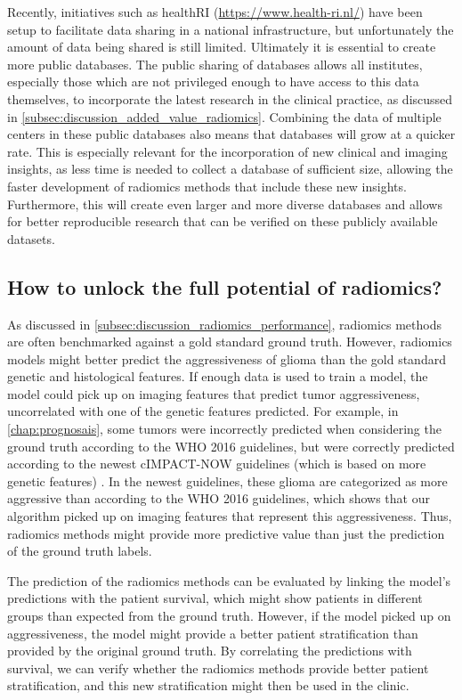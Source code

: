 Recently, initiatives such as healthRI (\url{https://www.health-ri.nl/}) have been setup to facilitate data sharing in a national infrastructure, but unfortunately the amount of data being shared is still limited.
Ultimately it is essential to create more public databases.
The public sharing of databases allows all institutes, especially those which are not privileged enough to have access to this data themselves, to incorporate the latest research in the clinical practice, as discussed in \cref{subsec:discussion_added_value_radiomics}.
Combining the data of multiple centers in these public databases also means that databases will grow at a quicker rate.
This is especially relevant for the incorporation of new clinical and imaging insights, as less time is needed to collect a database of sufficient size, allowing the faster development of radiomics methods that include these new insights.
Furthermore, this will create even larger and more diverse databases and allows for better reproducible research that can be verified on these publicly available datasets.



\subsection{How to unlock the full potential of radiomics?}

As discussed in \cref{subsec:discussion_radiomics_performance}, radiomics methods are often benchmarked against a gold standard ground truth.
However, radiomics models might better predict the aggressiveness of \gls{glioma} than the gold standard genetic and histological features.
If enough data is used to train a model, the model could pick up on imaging features that predict \gls{tumor} aggressiveness, uncorrelated with one of the genetic features predicted.
For example, in \cref{chap:prognosais}, some \glspl{tumor} were incorrectly predicted when considering the ground truth according to the \gls{WHO} 2016 guidelines, but were correctly predicted according to the newest cIMPACT-NOW guidelines (which is based on more genetic features) \autocite{lous2020impactnow}.
In the newest guidelines, these glioma are categorized as more aggressive than according to the \gls{WHO} 2016 guidelines, which shows that our algorithm picked up on imaging features that represent this aggressiveness.
Thus, radiomics methods might provide more predictive value than just the prediction of the ground truth labels.

The prediction of the radiomics methods can be evaluated by linking the model's predictions with the patient survival, which might show patients in different groups than expected from the ground truth.
However, if the model picked up on aggressiveness, the model might provide a better patient stratification than provided by the original ground truth.
By correlating the predictions with survival, we can verify whether the radiomics methods provide better patient stratification, and this new stratification might then be used in the clinic.

